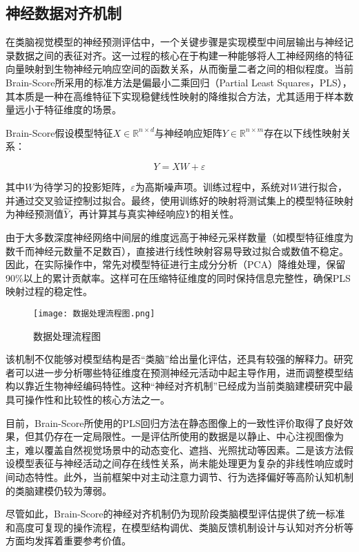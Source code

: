 \subsection{神经数据对齐机制}

在类脑视觉模型的神经预测评估中，一个关键步骤是实现模型中间层输出与神经记录数据之间的表征对齐。这一过程的核心在于构建一种能够将人工神经网络的特征向量映射到生物神经元响应空间的函数关系，从而衡量二者之间的相似程度。当前Brain-Score所采用的标准方法是偏最小二乘回归（Partial Least Squares，PLS），其本质是一种在高维特征下实现稳健线性映射的降维拟合方法，尤其适用于样本数量远小于特征维度的场景\cite{hair2019use}。

Brain-Score假设模型特征$X \in \mathbb{R}^{n \times d}$与神经响应矩阵$Y \in \mathbb{R}^{n \times m}$存在以下线性映射关系：

\begin{equation}
	Y = XW + \varepsilon
	\label{eq:linear_model}
\end{equation}

其中$W$为待学习的投影矩阵，$\varepsilon$为高斯噪声项。训练过程中，系统对$W$进行拟合，并通过交叉验证控制过拟合。最终，使用训练好的映射将测试集上的模型特征映射为神经预测值$\hat{Y}$，再计算其与真实神经响应$Y$的相关性。

由于大多数深度神经网络中间层的维度远高于神经元采样数量（如模型特征维度为数千而神经元数量不足数百），直接进行线性映射容易导致过拟合或数值不稳定。因此，在实际操作中，常先对模型特征进行主成分分析（PCA）降维处理，保留90\%以上的累计贡献率。这样可在压缩特征维度的同时保持信息完整性，确保PLS映射过程的稳定性。

\begin{figure}[hbt]
	\centering
	\texttt{[image: 数据处理流程图.png]}
	\caption{数据处理流程图}
	\label{f.sjcllct}
\end{figure}

该机制不仅能够对模型结构是否“类脑”给出量化评估，还具有较强的解释力。研究者可以进一步分析哪些特征维度在预测神经元活动中起主导作用，进而调整模型结构以靠近生物神经编码特性。这种“神经对齐机制”已经成为当前类脑建模研究中最具可操作性和比较性的核心方法之一。

目前，Brain-Score所使用的PLS回归方法在静态图像上的一致性评价取得了良好效果，但其仍存在一定局限性。一是评估所使用的数据是以静止、中心注视图像为主，难以覆盖自然视觉场景中的动态变化、遮挡、光照扰动等因素。二是该方法假设模型表征与神经活动之间存在线性关系，尚未能处理更为复杂的非线性响应或时间动态特性。此外，当前框架中对主动注意力调节、行为选择偏好等高阶认知机制的类脑建模仍较为薄弱。

尽管如此，Brain-Score的神经对齐机制仍为现阶段类脑模型评估提供了统一标准和高度可复现的操作流程，在模型结构调优、类脑反馈机制设计与认知对齐分析等方面均发挥着重要参考价值。

